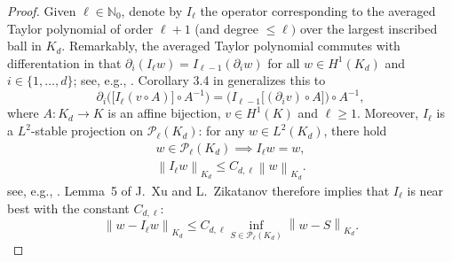 \documentclass[a4paper]{amsart}
\numberwithin{equation}{section}
\theoremstyle{plain}
\theoremstyle{definition}
\begin{document}
\begin{proof}
Given ${\ell}\in{\mathbb{N}}_0$, denote by $I_{\ell}$ the operator corresponding to the 
averaged Taylor polynomial of order ${\ell}+1$ (and degree $\leq{\ell})$ over the 
largest inscribed ball in ${{{K}_d}}$.  Remarkably, the averaged Taylor 
polynomial commutes with differentation in that $\partial_i (I_{\ell} 
w)=I_{{\ell}-1} (\partial_i w)$ for all $w\in{H^{1}}({{{K}_d}})$ and 
$i\in\{1,\dots,d\}$; see, e.g., \cite[(4.1.17)]{Brenner.Scott:08}.  Corollary 
3.4 in \cite{Dekel.Leviatan:04} generalizes this to
\begin{equation}\label{Diff-avgTaylor}
 \partial_i \Big( \big[ I_{\ell} (v\circ A) \big] \circ A^{-1} \Big)
 =
 \Big( I_{{\ell}-1} \big[ (\partial_i v) \circ A \big] \Big) \circ A^{-1},
\end{equation}
where $A:{{{K}_d}}\to{K}$ is an affine bijection, $v\in{H^{1}}({K})$ and 
${\ell}\geq1$.  Moreover, $I_{\ell}$ is a ${L^{2}}$-stable projection on 
${\mathcal{P}_{{\ell}}({{{{K}_d}}})}$: for any $w\in{L^{2}}({{{K}_d}})$, there hold
\begin{gather*}
 w\in{\mathcal{P}_{{\ell}}({{{{K}_d}}})} \implies I_{\ell} w = w,
\\
 {\left\|{I_{\ell} w}\right\|_{{{K}_d}}} \leq C_{d,{\ell}} {\left\|{w}\right\|_{{{K}_d}}}.
\end{gather*}
see, e.g., \cite[(4.1.15), (4.2.8)]{Brenner.Scott:08}.  Lemma~5 of J.~Xu and 
L.~Zikatanov \cite{Xu.Zikatanov:03} therefore implies that $I_{\ell}$ is near 
best with the constant $C_{d,{\ell}}$:
\begin{equation}\label{Ipdeg:nbest}
 {\left\|{w-I_{\ell} w}\right\|_{{{K}_d}}}
 \leq
 C_{d,{\ell}} \inf_{S\in{\mathcal{P}_{{\ell}}({{{{K}_d}}})}} {\left\|{w-S}\right\|_{{{K}_d}}}.
\end{equation}


\end{proof}
\end{document}
